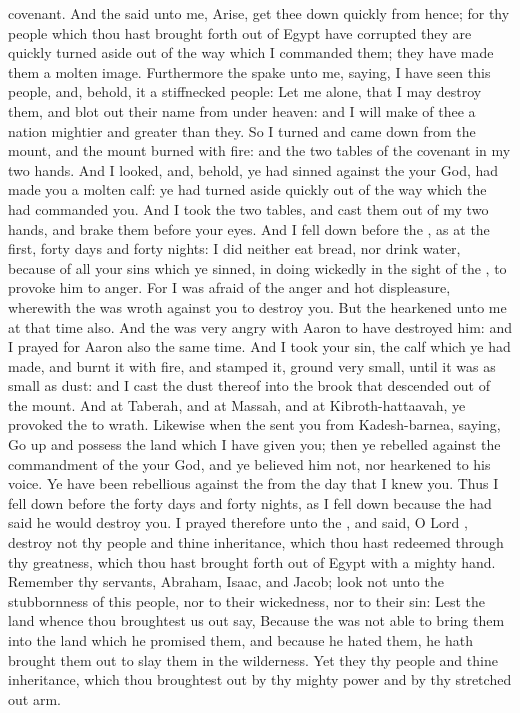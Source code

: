 {covenant.
And the
{}
said unto me,
Arise, get thee
down
quickly from hence; for thy
people which thou hast brought
forth out of
Egypt have
corrupted
{} they are
quickly turned
aside out of the
way which I
commanded them; they have
made them a molten
image.
Furthermore the
{}
spake unto me,
saying, I have
seen this
people, and, behold, it
{} a
stiffnecked
people:
Let me
alone, that I may
destroy them, and blot
out their
name from under
heaven: and I will
make
of thee a
nation
mightier and
greater than they.
So I
turned and came
down from the
mount, and the
mount
burned with
fire: and the
two
tables of the
covenant
{} in my
two
hands.
And I
looked, and, behold, ye had
sinned against the
{} your
God,
{} had
made you a
molten
calf: ye had turned
aside
quickly out of the
way which the
{} had
commanded you.
And I
took the
two
tables, and
cast them out
of my
two
hands, and
brake them before your
eyes.
And I fell
down
before the
{}, as at the
first,
forty
days and
forty
nights: I did neither
eat
bread, nor
drink
water, because of all your
sins which ye
sinned, in
doing
wickedly in the
sight of the
{}, to provoke him to
anger.
For I was
afraid
of the
anger and hot
displeasure, wherewith the
{} was
wroth against you to
destroy you. But the
{}
hearkened unto me at that
time also.
And the
{} was
very
angry with
Aaron to have
destroyed him: and I
prayed for
Aaron also the same
time.
And I
took your
sin, the
calf which ye had
made, and
burnt it with
fire, and
stamped it,
{}
ground
{} very
small,
{} until it was as
small as
dust: and I
cast the
dust thereof into the
brook that descended
out of the
mount.
And at
Taberah, and at
Massah, and at
Kibroth-hattaavah, ye provoked the
{} to
wrath.
Likewise when the
{}
sent you from
Kadesh-barnea,
saying, Go
up and
possess the
land which I have
given you; then ye
rebelled against the
commandment of the
{} your
God, and ye
believed him not, nor
hearkened to his
voice.
Ye have been
rebellious against the
{} from the
day that I
knew you.
Thus I fell
down
before the
{}
forty
days and
forty
nights, as I fell
down
{} because the
{} had
said he would
destroy you.
I
prayed therefore unto the
{}, and
said, O
Lord
{},
destroy not thy
people and thine
inheritance, which thou hast
redeemed through thy
greatness, which thou hast brought
forth out of
Egypt with a
mighty
hand.
Remember thy
servants,
Abraham,
Isaac, and
Jacob;
look not unto the
stubbornness of this
people, nor to their
wickedness, nor to their
sin:
Lest the
land whence thou broughtest us
out
say, Because the
{} was not
able to
bring them into the
land which he
promised them, and because he
hated them, he hath brought them
out to
slay them in the
wilderness.
Yet they
{} thy
people and thine
inheritance, which thou broughtest
out by thy
mighty
power and by thy stretched
out
arm.

}
